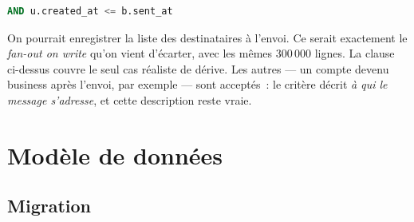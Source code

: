 \begin{lstlisting}[language=SQL, numbers=none]
AND u.created_at <= b.sent_at
\end{lstlisting}

\begin{note}
On pourrait enregistrer la liste des destinataires à l'envoi. Ce serait exactement le
\emph{fan-out on write} qu'on vient d'écarter, avec les mêmes 300\,000 lignes. La clause
ci-dessus couvre le seul cas réaliste de dérive. Les autres --- un compte devenu business
après l'envoi, par exemple --- sont acceptés~: le critère décrit \emph{à qui le message
s'adresse}, et cette description reste vraie.
\end{note}

\chapter{Modèle de données}

\section{Migration }

